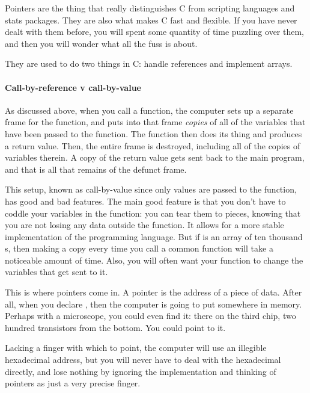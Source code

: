\documentclass[12pt]{article}
\def\ind#1{\index{#1}#1}
\begin{document}
Pointers are the thing that really distinguishes C from scripting
languages and stats packages. They are also what makes C fast and
flexible. If you have never dealt with them before, you will spent some
quantity of time puzzling over them, and then you will wonder what all the
fuss is about. 

They are used to do two things in C: handle references and implement arrays.

\paragraph{Call-by-reference v \ind{call-by-value}} 
  
As discussed above, when you call a function, the computer sets up a
separate frame for the function, and puts into that frame {\it copies} of
all of the variables that have been passed to the function. The function
then does its thing and produces a return value. Then, the entire frame
is destroyed, including all of the copies of variables therein. A copy
of the return value gets sent back to the main program, and that is all
that remains of the defunct frame.

This setup, known as call-by-value since only values are passed to the
function, has good and bad features. The main good feature is that you
don't have to coddle your variables in the function: you can tear them to
pieces, knowing that you are not losing any data outside the function. It
allows for a more stable implementation of the programming language. But if 
is an array of ten thousand s, then making a copy every time
you call a common function will take a noticeable amount of time. Also,
you will often want your function to change the variables that get
sent to it.

This is where pointers come in. A pointer is the address of a piece of
data. After all, when you declare , then the computer is
going to put  somewhere in memory. Perhaps with a microscope,
you could even find it: there on the third chip, two hundred transistors
from the bottom. You could point to it.

Lacking a finger with which to point, the computer will use
an illegible hexadecimal address, but you will never have to deal with
the hexadecimal directly, and lose nothing by ignoring the implementation
and thinking of pointers as just a very precise finger.
\end{document}

